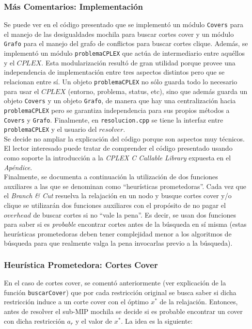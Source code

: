 \newpage
\subsubsection{Más Comentarios: Implementación}

Se puede ver en el código presentado que se implementó un módulo \verb_Covers_ para el manejo de las desigualdades mochila para buscar cortes cover y un módulo \verb_Grafo_ para el manejo del grafo de conflictos para buscar cortes clique. Además, se implementó un módulo \verb_problemaCPLEX_ que actúa de intermediario entre aquéllos y el $CPLEX$. Esta modularización resultó de gran utilidad porque provee una independencia de implementación entre tres aspectos distintos pero que se relacionan entre sí. Un objeto \verb_problemaCPLEX_ no sólo guarda todo lo necesario para usar el $CPLEX$ (entorno, problema, status, etc), sino que además guarda un objeto \verb_Covers_ y un objeto \verb_Grafo_, de manera que hay una centralización hacia \verb_problemaCPLEX_ pero se garantiza independencia para sus propios métodos a \verb_Covers_ y \verb_Grafo_. Finalmente, en \verb_resolucion.cpp_ se tiene la interfaz entre \verb_problemaCPLEX_ y el usuario del $resolver$.\\

Se decide no ampliar la explicación del código porque son aspectos muy técnicos. El lector interesado puede tratar de comprender el código presentado usando como soporte la introducción a la \emph{CPLEX C Callable Library} expuesta en el  \emph{Apéndice}.\\

Finalmente, se documenta a continuación la utilización de dos funciones auxiliares a las que se denominan como ``heurísticas prometedoras''. Cada vez que el \emph{Branch \& Cut} resuelva la relajación en un nodo y busque cortes cover y/o clique se utilizarán dos funciones auxiliares con el propósito de no pagar el $overhead$ de buscar cortes si no ``vale la pena''. Es decir, se usan dos funciones para saber si es \emph{probable} encontrar cortes antes de la búsqueda en sí misma (estas heurísticas prometedoras deben tener complejidad menor a los algoritmos de búsqueda para que realmente valga la pena invocarlas previo a la búsqueda).

\subsubsection*{Heurística Prometedora: Cortes Cover}

En el caso de cortes cover, se comentó anteriormente (ver explicación de la función \verb_buscarCover_) que por cada restricción original se busca saber si dicha restricción induce a un corte cover con el óptimo $x^*$ de la relajación. Entonces, antes de resolver el sub-MIP mochila se decide si es probable encontrar un cover con dicha restricción $a_r$ y el valor de $x^*$. La idea es la siguiente:

